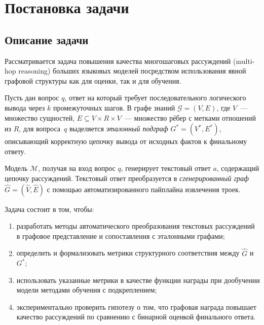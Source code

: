 \section{Постановка задачи}
\label{sec:Chapter1} 

\subsection{Описание задачи}
\label{subsec:task-description}

Рассматривается задача повышения качества многошаговых рассуждений (multi-hop reasoning) больших языковых моделей посредством использования явной графовой структуры как для оценки, так и для обучения.

Пусть дан вопрос $q$, ответ на который требует последовательного логического вывода через $k$ промежуточных шагов. В графе знаний $\mathcal{G} = (V, E)$, где $V$~--- множество сущностей, $E \subseteq V \times R \times V$~--- множество рёбер с метками отношений из $R$, для вопроса~$q$ выделяется \textit{эталонный подграф} $G^* = (V^*, E^*)$, описывающий корректную цепочку вывода от исходных фактов к финальному ответу.

Модель $\mathcal{M}$, получая на вход вопрос $q$, генерирует текстовый ответ $a$, содержащий цепочку рассуждений. Текстовый ответ преобразуется в \textit{сгенерированный граф} $\hat{G} = (\hat{V}, \hat{E})$ с помощью автоматизированного пайплайна извлечения троек.

Задача состоит в том, чтобы:
\begin{enumerate}
    \setlength{\itemsep}{\smallskipamount}
    \item разработать методы автоматического преобразования текстовых рассуждений в графовое представление и сопоставления с эталонными графами;
    \item определить и формализовать метрики структурного соответствия между $\hat{G}$ и $G^*$;
    \item использовать указанные метрики в качестве функции награды при дообучении модели методами обучения с подкреплением;
    \item экспериментально проверить гипотезу о том, что графовая награда повышает качество рассуждений по сравнению с бинарной оценкой финального ответа.
\end{enumerate}

